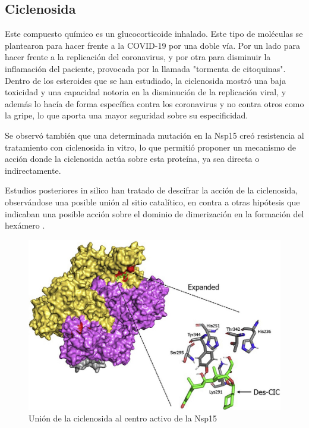 \documentclass[12pt]{article}
\begin{document}
\subsection{Ciclenosida}
Este compuesto químico es un glucocorticoide inhalado. Este tipo de moléculas se plantearon para hacer frente a la COVID-19 por una doble vía. Por un lado para hacer frente a la replicación del coronavirus, y por otra para disminuir la inflamación del paciente, provocada por la llamada "tormenta de citoquinas". Dentro de los esteroides que se han estudiado, la ciclenosida mostró una baja toxicidad y una capacidad notoria en la disminución de la replicación viral, y además lo hacía de forma específica contra los coronavirus y no contra otros como la gripe, lo que aporta una mayor seguridad sobre su especificidad. \cite{Matsuyama2020.03.11.987016}
\newline

Se observó también que una determinada mutación en la Nsp15 creó resistencia al tratamiento con ciclenosida in vitro, lo que permitió proponer un mecanismo de acción donde la ciclenosida actúa sobre esta proteína, ya sea directa o indirectamente.
\newline

Estudios posteriores in silico han tratado de descifrar la acción de la ciclenosida, observándose una posible unión al sitio catalítico, en contra a otras hipótesis que indicaban una posible acción sobre el dominio de dimerización en la formación del hexámero \cite{pmid32593491}.
\newline

\begin{figure}[H]
\centering
\includegraphics[scale=0.75]{Screenshoot_26}
\caption{Unión de la ciclenosida al centro activo de la Nsp15}
\end{figure}
\end{document}
